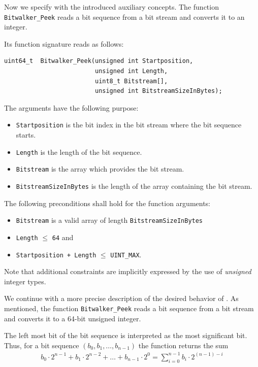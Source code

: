 Now we specify \peek with the introduced auxiliary concepts.
The function \texttt{Bitwalker\_Peek} reads a bit sequence from a bit stream
and converts it to an integer.

Its function signature reads as follows:

\begin{lstlisting}[style=acsl-block]
uint64_t  Bitwalker_Peek(unsigned int Startposition, 
                         unsigned int Length,
                         uint8_t Bitstream[],
                         unsigned int BitstreamSizeInBytes);
\end{lstlisting}

The arguments have the following purpose:
\begin{itemize}
    \item \texttt{Startposition} is the bit index in the bit stream 
    where the bit sequence starts.
    \item \texttt{Length} is the length of the bit sequence.
    \item \texttt{Bitstream} is the array which provides the bit stream.
    \item \texttt{BitstreamSizeInBytes} is the length of the array 
    containing the bit stream. 
\end{itemize}


The following preconditions shall hold for the function arguments:
\begin{itemize}
\item \texttt{Bitstream} is a valid array of length \verb"BitstreamSizeInBytes"

\item \texttt{Length} $\leq$ \texttt{64} and

\item \texttt{Startposition + Length} $\leq$ \verb"UINT_MAX".
\end{itemize}

Note that additional constraints are implicitly expressed by the use
of \emph{unsigned} integer types.

We continue with a more precise description of the desired behavior of \peek.
As mentioned, the function \texttt{Bitwalker\_Peek} reads a bit sequence from a bit stream
and converts it to a 64-bit unsigned integer.

The left most bit of the bit sequence is interpreted as
the most significant bit.
Thus, for a bit sequence $(b_0, b_1,\ldots,b_{n - 1})$ the function
returns the sum
\begin{align}
    b_0 \cdot 2^{n - 1} + b_1\cdot 2^{n - 2} + \ldots + b_{n-1}\cdot 2^0
    =
    \sum_{i=0}^{n-1} b_i \cdot 2^{(n - 1) - i} 
\end{align}

